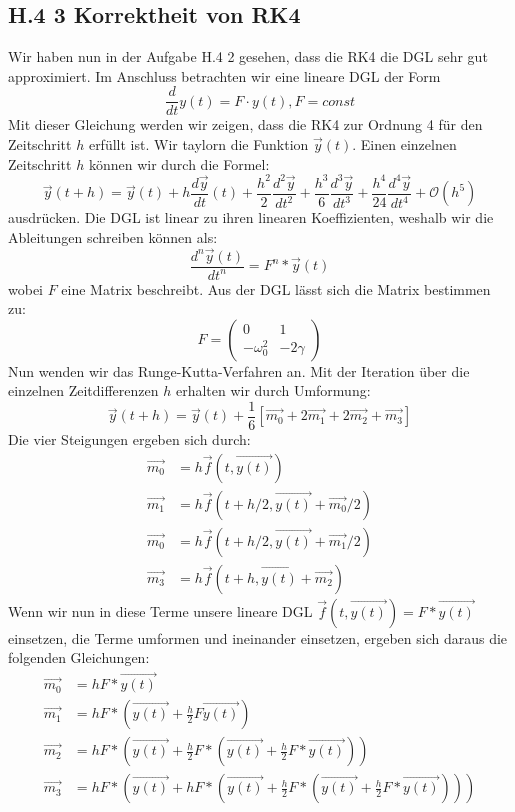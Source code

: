\documentclass[ngerman]{scrartcl}
\begin{document}
\subsection{H.4 3 Korrektheit von RK4}
Wir haben nun in der Aufgabe H.4 2 gesehen, dass die RK4 die DGL sehr gut approximiert. Im Anschluss betrachten wir eine lineare DGL der Form
\begin{equation}
\frac{d}{dt}y(t)=F \cdot y(t) , F=const
\end{equation}
Mit dieser Gleichung werden wir zeigen, dass die RK4 zur Ordnung 4 für den Zeitschritt $h$ erfüllt ist. Wir taylorn die Funktion $\vec{y}(t)$. Einen einzelnen Zeitschritt $h$ können wir durch die Formel: 
\begin{equation} \vec{y}(t+h) = \vec{y}(t) + h\frac{d\vec{y}}{dt}(t) + \frac{h^2}{2}\frac{d^2\vec{y}}{dt^2} + \frac{h^3}{6}\frac{d^3\vec{y}}{dt^3} + \frac{h^4}{24}\frac{d^4\vec{y}}{dt^4} + \mathcal{O}(h^5) \end{equation} ausdrücken. Die DGL ist linear zu ihren linearen Koeffizienten, weshalb wir die Ableitungen schreiben können als:
\begin{equation*} \frac{d^n\vec{y}(t)}{dt^n} = F^n*\vec{y}(t) \end{equation*} wobei $F$ eine Matrix beschreibt. Aus der DGL lässt sich die Matrix bestimmen zu: \begin{equation*} F = \begin{pmatrix} 0 & 1 \\ -\omega_0^2 & -2\gamma \end{pmatrix} \end{equation*}
Nun wenden wir das Runge-Kutta-Verfahren an. Mit der Iteration über die einzelnen Zeitdifferenzen $h$ erhalten wir durch Umformung: \begin{equation} \vec{y}(t+h) = \vec{y}(t) + \frac{1}{6}[\vec{m_0} + 2\vec{m_1} + 2\vec{m_2} + \vec{m_3}] \end{equation} Die vier Steigungen ergeben sich durch: 
\begin{align*} \vec{m_0} &= h\vec{f}(t, \vec{y(t)}) \\  \vec{m_1} &= h\vec{f}(t+h/2, \vec{y(t)}+\vec{m_0}/2) \\  \vec{m_0} &= h\vec{f}(t+h/2, \vec{y(t)}+\vec{m_1}/2) \\  \vec{m_3} &= h\vec{f}(t+h , \vec{y(t)} + \vec{m_2}) \end{align*}
Wenn wir nun in diese Terme unsere lineare DGL $\vec{f}(t, \vec{y(t)}) = F*\vec{y(t)}$ einsetzen, die Terme umformen und ineinander einsetzen, ergeben sich daraus die folgenden Gleichungen: \begin{align}  \vec{m_0} &= hF*\vec{y(t)} \\  \vec{m_1} &= hF*\left(\vec{y(t)} + \frac{h}{2}F\vec{y(t)}\right) \\  \vec{m_2} &= hF*\left(\vec{y(t)} + \frac{h}{2}F*\left(\vec{y(t)} + \frac{h}{2}F*\vec{y(t)}\right)\right) \\  \vec{m_3} &= hF*\left(\vec{y(t)} + hF*\left(\vec{y(t)}+\frac{h}{2}F*\left(\vec{y(t)} + \frac{h}{2}F*\vec{y(t)}\right)\right)\right) \end{align}
\end{document}

